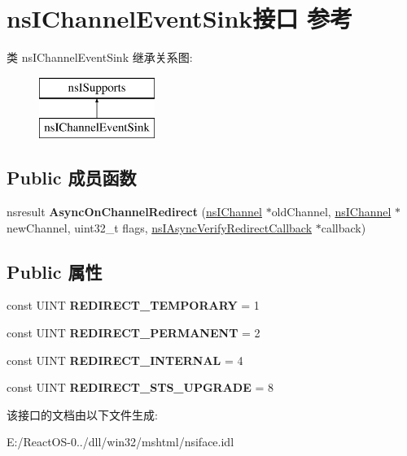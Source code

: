 \hypertarget{interfacens_i_channel_event_sink}{}\section{ns\+I\+Channel\+Event\+Sink接口 参考}
\label{interfacens_i_channel_event_sink}
类 ns\+I\+Channel\+Event\+Sink 继承关系图\+:\begin{figure}[H]
\begin{center}
\leavevmode
\includegraphics[height=2.000000cm]{interfacens_i_channel_event_sink}
\end{center}
\end{figure}
\subsection*{Public 成员函数}
\begin{DoxyCompactItemize}
\item 
\mbox{\label{interfacens_i_channel_event_sink_a19e519544e7e828a5abcc7e83bec92b9}} 
nsresult {\bfseries Async\+On\+Channel\+Redirect} (\hyperlink{interfacens_i_channel}{ns\+I\+Channel} $\ast$old\+Channel, \hyperlink{interfacens_i_channel}{ns\+I\+Channel} $\ast$new\+Channel, uint32\+\_\+t flags, \hyperlink{interfacens_i_async_verify_redirect_callback}{ns\+I\+Async\+Verify\+Redirect\+Callback} $\ast$callback)
\end{DoxyCompactItemize}
\subsection*{Public 属性}
\begin{DoxyCompactItemize}
\item 
\mbox{\label{interfacens_i_channel_event_sink_a00ec5589ff36cc973c3ddd6e62558380}} 
const U\+I\+NT {\bfseries R\+E\+D\+I\+R\+E\+C\+T\+\_\+\+T\+E\+M\+P\+O\+R\+A\+RY} = 1
\item 
\mbox{\label{interfacens_i_channel_event_sink_ab424b284472bb7d0b8fb0685facdb21a}} 
const U\+I\+NT {\bfseries R\+E\+D\+I\+R\+E\+C\+T\+\_\+\+P\+E\+R\+M\+A\+N\+E\+NT} = 2
\item 
\mbox{\label{interfacens_i_channel_event_sink_a439fd79030abd05992cb2117e773d22f}} 
const U\+I\+NT {\bfseries R\+E\+D\+I\+R\+E\+C\+T\+\_\+\+I\+N\+T\+E\+R\+N\+AL} = 4
\item 
\mbox{\label{interfacens_i_channel_event_sink_ad2d9c0fa82752708b5cf3ed892ce7b89}} 
const U\+I\+NT {\bfseries R\+E\+D\+I\+R\+E\+C\+T\+\_\+\+S\+T\+S\+\_\+\+U\+P\+G\+R\+A\+DE} = 8
\end{DoxyCompactItemize}


该接口的文档由以下文件生成\+:\begin{DoxyCompactItemize}
\item 
E\+:/\+React\+O\+S-\/0../dll/win32/mshtml/nsiface.\+idl\end{DoxyCompactItemize}
